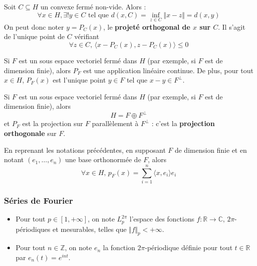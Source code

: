   \begin{theorem}
    Soit $C \subseteq H$ un convexe fermé non-vide. Alors :
    \[ \forall x \in H, \exists! y \in C \text{ tel que } d(x, C) = \inf_{z \in C} \Vert x - z \Vert = d(x, y) \]
    On peut donc noter $y = P_C(x)$, le \textbf{projeté orthogonal de $x$ sur $C$}. Il s'agit de l'unique point de $C$ vérifiant
    \[ \forall z \in C, \, \langle x - P_C(x), z - P_C(x) \rangle \leq 0 \]
  \end{theorem}

  \begin{theorem}
    Si $F$ est un sous espace vectoriel fermé dans $H$ (par exemple, si $F$ est de dimension finie), alors $P_F$ est une application linéaire continue. De plus, pour tout $x \in H$, $P_F(x)$ est l'unique point $y \in F$ tel que $x-y \in F^\perp$.
  \end{theorem}

  \begin{theorem}
    Si $F$ est un sous espace vectoriel fermé dans $H$ (par exemple, si $F$ est de dimension finie), alors
    \[ H = F \oplus F^\perp \]
    et $P_F$ est la projection sur $F$ parallèlement à $F^\perp$ : c'est la \textbf{projection orthogonale} sur $F$.
  \end{theorem}


  \begin{remark}
    En reprenant les notations précédentes, en supposant $F$ de dimension finie et en notant $(e_1, \dots, e_n)$ une base orthonormée de $F$, alors
    \[ \forall x \in H, \, p_F(x) = \sum_{i=1}^{n} \langle x, e_i \rangle e_i \]
  \end{remark}

  \subsubsection{Séries de Fourier}


  \begin{notation}
    \begin{itemize}
      \item Pour tout $p \in [1, +\infty]$, on note $L_p^{2\pi}$ l'espace des fonctions $f : \mathbb{R} \rightarrow \mathbb{C}$, $2\pi$-périodiques et mesurables, telles que $\Vert f \Vert_p < +\infty$.
      \item Pour tout $n \in \mathbb{Z}$, on note $e_n$ la fonction $2\pi$-périodique définie pour tout $t \in \mathbb{R}$ par $e_n(t) = e^{int}$.
    \end{itemize}
  \end{notation}


